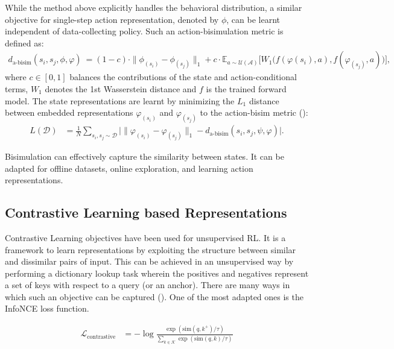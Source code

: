 \documentclass{article}
\begin{document}
While the method above explicitly handles the behavioral distribution, a similar objective for single-step action representation, denoted by $\phi$, can be learnt independent of data-collecting policy. Such an action-bisimulation metric is defined as:
\begin{align}
d_{\text{a-bisim}}(s_i, s_j, \phi, \varphi) 
&= (1-c) \cdot \| \phi_(s_i) - \phi_(s_j) \|_1 
   + c \cdot \mathbb{E}_{a \sim \mathcal{U}(\mathcal{A})} 
       \Big[ W_1 \big( f(\varphi(s_i), a), f(\varphi_(s_j), a) \big) \Big],
\label{eq:da_bisim}
\end{align}
where $c \in [0,1]$ balances the contributions of the state and action-conditional terms, $W_1$ denotes the 1st Wasserstein distance and $f$ is the trained  forward model. The state representations are learnt by minimizing the $L_1$ distance between embedded representations 
$\varphi_(s_i)$ and $\varphi_(s_j)$ to the action-bisim metric (\cite{rudolph2024learning}):
\begin{align}
L(\mathcal{D}) 
&= \frac{1}{N} \sum_{s_i, s_j \sim \mathcal{D}} 
   \Big| \| \varphi_(s_i) - \varphi_(s_j) \|_1 
   - d_{\text{a-bisim}}(s_i, s_j, \psi, \varphi) \Big|.
\label{eq:da_bisim_loss}
\end{align}

Bisimulation can effectively capture the similarity between states. It can be adapted for offline datasets, online exploration, and learning action representations. 

\subsection{Contrastive Learning based Representations}

Contrastive Learning objectives have been used for unsupervised RL. It is a framework to learn representations by exploiting the structure between similar and dissimilar pairs of input. This can be achieved in an unsupervised way by performing a dictionary lookup task wherein the positives and negatives represent a set of keys with respect to a query (or an anchor). There are many ways in which such an objective can be captured (\cite{laskin2020curl}). One of the most adapted ones is the InfoNCE loss function. 

\begin{align}
\mathcal{L}_{\text{contrastive}} &= 
- \log \frac{\exp(\text{sim}(q, k^+)/\tau)}
       {\sum_{k \in \mathcal{K}} \exp(\text{sim}(q, k)/\tau)}
\end{align}
\end{document}
